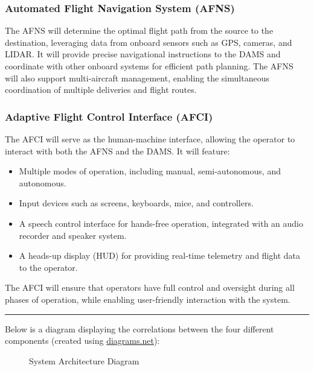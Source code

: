 \documentclass[12pt]{article}
\begin{document}
\subsubsection{Automated Flight Navigation System (AFNS)}
The AFNS will determine the optimal flight path from the source to the destination, leveraging data from onboard sensors such as GPS, cameras, and LIDAR. It will provide precise navigational instructions to the DAMS and coordinate with other onboard systems for efficient path planning. The AFNS will also support multi-aircraft management, enabling the simultaneous coordination of multiple deliveries and flight routes.

\subsubsection{Adaptive Flight Control Interface (AFCI)}
The AFCI will serve as the human-machine interface, allowing the operator to interact with both the AFNS and the DAMS. It will feature:
\begin{itemize}
    \item Multiple modes of operation, including manual, semi-autonomous, and autonomous.
    \item Input devices such as screens, keyboards, mice, and controllers.
    \item A speech control interface for hands-free operation, integrated with an audio recorder and speaker system.
    \item A heads-up display (HUD) for providing real-time telemetry and flight data to the operator.
\end{itemize}
The AFCI will ensure that operators have full control and oversight during all phases of operation, while enabling user-friendly interaction with the system.

\noindent\rule{\textwidth}{0.4pt}

Below is a diagram displaying the correlations between the four different components (created using \href{https://www.diagrams.net/}{diagrams.net}):

\begin{figure}[h]
    \centering
    \caption{System Architecture Diagram}
\end{figure}
\end{document}
